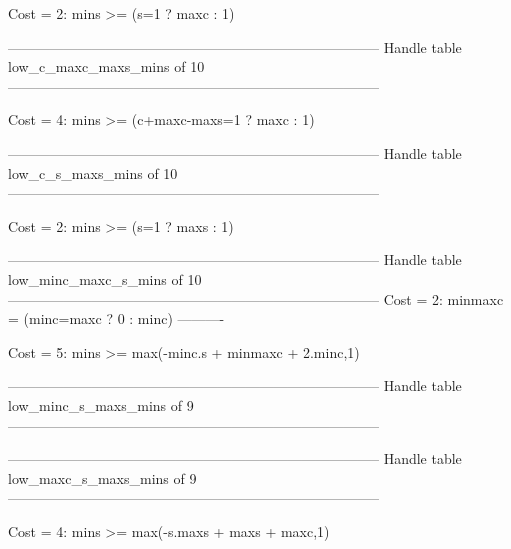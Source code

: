 Cost =  2:  mins >= (s=1 ? maxc : 1)

--------------------------------------------------------------------------------
Handle table low_c_maxc_maxs_mins of 10
--------------------------------------------------------------------------------

Cost =  4:  mins >= (c+maxc-maxs=1 ? maxc : 1)

--------------------------------------------------------------------------------
Handle table low_c_s_maxs_mins of 10
--------------------------------------------------------------------------------

Cost =  2:  mins >= (s=1 ? maxs : 1)

--------------------------------------------------------------------------------
Handle table low_minc_maxc_s_mins of 10
--------------------------------------------------------------------------------
Cost =  2:  minmaxc = (minc=maxc ? 0 : minc)
----------

Cost =  5:  mins >= max(-minc.s + minmaxc + 2.minc,1)

--------------------------------------------------------------------------------
Handle table low_minc_s_maxs_mins of 9
--------------------------------------------------------------------------------


--------------------------------------------------------------------------------
Handle table low_maxc_s_maxs_mins of 9
--------------------------------------------------------------------------------

Cost =  4:  mins >= max(-s.maxs + maxs + maxc,1)

